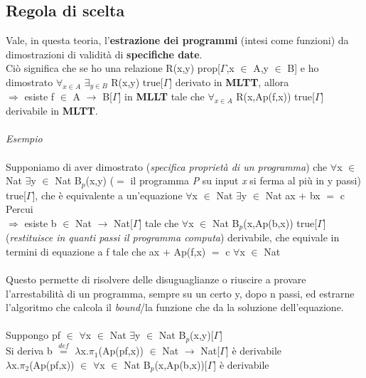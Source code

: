 \subsection{Regola di scelta}
\label{subsec:regola-di-scelta}
Vale, in questa teoria, l'\textbf{estrazione dei programmi} (intesi come funzioni) da dimostrazioni di validit\`a di \textbf{specifiche date}.\\ Ci\`o significa che se ho una relazione R(x,y) prop[$\Gamma$,x $\in$ A,y $\in$ B] e ho dimostrato $\forall_{x \in A}$ $\exists_{y \in B}$ R(x,y) true[$\Gamma$] derivato in \textbf{MLTT}, allora\\
$\Rightarrow$ esiste f $\in$ A $\rightarrow$ B[$\Gamma$] in \textbf{MLLT} tale che $\forall_{x \in A}$ R(x,Ap(f,x)) true[$\Gamma$] derivabile in \textbf{MLTT}.
\\\\
\noindent
\textit{Esempio}\\\\
\noindent
Supponiamo di aver dimostrato (\textit{specifica propriet\`a di un programma}) che $\forall$x $\in$ Nat $\exists$y $\in$ Nat B$_p$(x,y) ($=$ il programma \textit{P} su input \textit{x} si ferma al pi\`u in y passi) true[$\Gamma$], che \`e equivalente a un'equazione $\forall$x $\in$ Nat $\exists$y $\in$ Nat  ax $+$ bx $=$ c\\
Percui\\
$\Rightarrow$ esiste b $\in$ Nat $\rightarrow$ Nat[$\Gamma$] tale che $\forall$x $\in$ Nat B$_p$(x,Ap(b,x)) true[$\Gamma$] (\textit{restituisce in quanti passi il programma computa}) derivabile, che equivale in termini di equazione a f tale che ax $+$ Ap(f,x) $=$ c $\forall$x $\in$ Nat\\\\
\noindent
Questo permette di risolvere delle disuguaglianze o riuscire a provare l'arrestabilit\`a di un programma, sempre su un certo y, dopo n passi, ed estrarne l'algoritmo che calcola il \textit{bound}/la funzione che da la soluzione dell'equazione.\\\\
\noindent
Suppongo pf $\in$ $\forall$x $\in$ Nat $\exists$y $\in$ Nat B$_p$(x,y)[$\Gamma$]\\
Si deriva b ${\overset{\mathit{def}}{=}}$ $\lambda$x.$\pi_1$(Ap(pf,x)) $\in$ Nat $\rightarrow$ Nat[$\Gamma$] \`e derivabile\\  $\lambda$x.$\pi_2$(Ap(pf,x)) $\in$ $\forall$x $\in$ Nat B$_p$(x,Ap(b,x))[$\Gamma$] \`e derivabile

